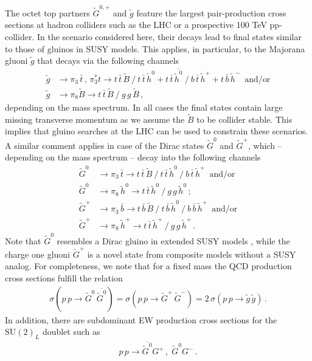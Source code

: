 \documentclass[preprintnumbers,nofootinbib,showpacs,eqsecnum,pre,12pt]{revtex4-1}
\newcommand{\SU}{\text{SU}}
\begin{document}
The octet top partners $\tilde G^{0,+}$ and $\tilde g$ feature the largest pair-production cross sections at hadron colliders such as the LHC or a prospective 100 TeV pp-collider. 
In the scenario considered here, their decays lead to final states similar to those of gluinos
in SUSY models. This applies, in particular, to the Majorana gluoni $\tilde g$ that decays via the following channels
\begin{subequations}
\begin{align}
\tilde g &\to \pi_3 \,\bar{t}\,,\,   \pi_3^* t \to t\,\bar{t} \, \tilde B \ / \ t\,\bar{t} \, \tilde{h}^0 + t\,\bar{t} \, \overline{\tilde{h}^0} \ / \ b\,\bar{t} \, \tilde{h}^+ +  t\,\bar{b} \, \tilde{h}^-  \,\,\, \mbox{and/or} \label{eq:gpi3dec}\\
\tilde g   & \to \pi_8 \tilde B \to t\,\bar{t} \, \tilde B\ / \  g\,g \, \tilde B \, ,\label{eq:gpi8dec}
\end{align}\end{subequations}
depending on the mass spectrum.
In all cases the final states contain large missing transverse momentum as we assume the $\tilde B$ to be collider stable. This implies that gluino searches at the LHC can be used to constrain these scenarios. 
A similar comment applies in case of the Dirac states $\tilde G^0$ and $\tilde G^+$, which -- depending on the mass spectrum -- decay into the following channels
\begin{subequations}\begin{align}
\tilde G^0  &\to \pi_3 \,\bar{t}  \to t\,\bar{t} \, \tilde B \ / \ t\,\bar{t} \, \tilde{h}^0 \ / \ b\,\bar{t} \, \tilde{h}^+ \,\,\, \mbox{and/or} \label{eq:G0pi3dec}\\
\tilde G^0  &\to \pi_8 \, \tilde h^0   \to t\,\bar{t} \, \tilde h^0 \ /\ g \, g \, \tilde h^0\,;  \label{eq:G0pi8dec}\\
\tilde G^+  &\to \pi_3 \,\bar{b}  \to t\,\bar{b} \, \tilde B \ / \ t\,\bar{b} \, \tilde{h}^0 \ / \ b\,\bar{b} \, \tilde{h}^+ \,\,\, \mbox{and/or}\label{eq:G+pi3dec}\\
\tilde G^+  &\to \pi_8 \, \tilde h^+   \to t\,\bar{t} \, \tilde h^+ \ / \ g \, g \, \tilde h^+ \,.\label{eq:G+pi8dec}
\end{align} \end{subequations}
Note that $\tilde{G}^0$ resembles a Dirac gluino in extended SUSY models \cite{Choi:2008pi}, while the charge one gluoni $\tilde{G}^+$ is a novel state from composite models without a SUSY analog.
For completeness, we note that for a fixed mass the QCD production cross sections fulfill the relation
\begin{align}
\sigma(p\,p\to \tilde G^0 \, \overline{\tilde G^0}) = \sigma(p\,p\to \tilde G^+ \, \tilde G^-)
= 2\, \sigma(p\,p\to \tilde g \, \tilde g)\,.
\end{align}
In addition, there are  subdominant EW production cross sections for the $\SU(2)_L$ doublet such as
\begin{align}
p \, p \to \overline{\tilde G^0} G^+ \,, \; \tilde G^0 G^-\,. 
\end{align} 
\end{document}
